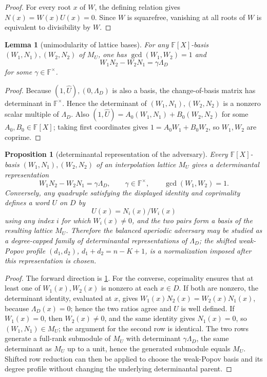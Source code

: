 \documentclass[11pt]{article}
\newtheorem{lemma}[lemma]{Lemma}
\newtheorem{proposition}[proposition]{Proposition}
\theoremstyle{definition}
\theoremstyle{remark}
\newcommand{\F}{\mathbb{F}}
\begin{document}
\begin{proof}
For every root \(x\) of \(W\), the defining relation gives \(N(x)=W(x)U(x)=0\).  Since \(W\) is squarefree, vanishing at all roots of \(W\) is equivalent to divisibility by \(W\).
\end{proof}

\begin{lemma}[unimodularity of lattice bases]\label{lem:capfr1-unimodular}
For any \(\F[X]\)-basis \((W_1,N_1),(W_2,N_2)\) of \(M_U\), one has \(\gcd(W_1,W_2)=1\) and
\[
        W_1N_2-W_2N_1=\gamma\Lambda_D
\]
for some \(\gamma\in\F^\times\).
\end{lemma}

\begin{proof}
Because \((1,\widehat U),(0,\Lambda_D)\) is also a basis, the change-of-basis matrix has determinant in \(\F^\times\).  Hence the determinant of \((W_1,N_1),(W_2,N_2)\) is a nonzero scalar multiple of \(\Lambda_D\).  Also \((1,\widehat U)=A_0(W_1,N_1)+B_0(W_2,N_2)\) for some \(A_0,B_0\in\F[X]\); taking first coordinates gives \(1=A_0W_1+B_0W_2\), so \(W_1,W_2\) are coprime.
\end{proof}

\begin{proposition}[determinantal representation of the adversary]\label{prop:capfr1-detrep}
Every \(\F[X]\)-basis \((W_1,N_1),(W_2,N_2)\) of an interpolation lattice \(M_U\) gives a determinantal representation
\[
        W_1N_2-W_2N_1=\gamma\Lambda_D,
        \qquad
        \gamma\in\F^\times,
        \qquad
        \gcd(W_1,W_2)=1.
\]
Conversely, any quadruple satisfying the displayed identity and coprimality defines a word \(U\) on \(D\) by
\[
        U(x)=N_i(x)/W_i(x)
\]
using any index \(i\) for which \(W_i(x)\ne0\), and the two pairs form a basis of the resulting lattice \(M_U\).  Therefore the balanced aperiodic adversary may be studied as a degree-capped family of determinantal representations of \(\Lambda_D\); the shifted weak-Popov profile \((d_1,d_2)\), \(d_1+d_2=n-K+1\), is a normalization imposed after this representation is chosen.
\end{proposition}

\begin{proof}
The forward direction is \cref{lem:capfr1-unimodular}.  For the converse, coprimality ensures that at least one of \(W_1(x),W_2(x)\) is nonzero at each \(x\in D\).  If both are nonzero, the determinant identity, evaluated at \(x\), gives \(W_1(x)N_2(x)=W_2(x)N_1(x)\), because \(\Lambda_D(x)=0\); hence the two ratios agree and \(U\) is well defined.  If \(W_1(x)=0\), then \(W_2(x)\ne0\), and the same identity gives \(N_1(x)=0\), so \((W_1,N_1)\in M_U\); the argument for the second row is identical.  The two rows generate a full-rank submodule of \(M_U\) with determinant \(\gamma\Lambda_D\), the same determinant as \(M_U\) up to a unit, hence the generated submodule equals \(M_U\).  Shifted row reduction can then be applied to choose the weak-Popov basis and its degree profile without changing the underlying determinantal parent.
\end{proof}
\end{document}
